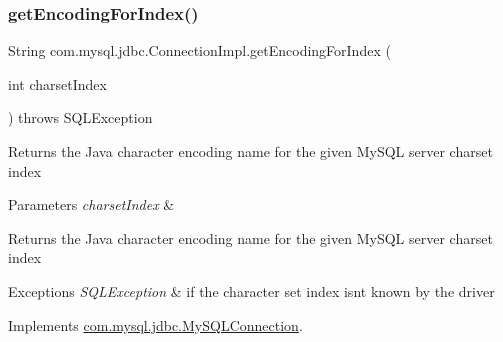 \subsubsection{\texorpdfstring{get\+Encoding\+For\+Index()}{getEncodingForIndex()}}
{\footnotesize\ttfamily String com.\+mysql.\+jdbc.\+Connection\+Impl.\+get\+Encoding\+For\+Index (\begin{DoxyParamCaption}\item[{int}]{charset\+Index }\end{DoxyParamCaption}) throws S\+Q\+L\+Exception}

Returns the Java character encoding name for the given My\+S\+QL server charset index


\begin{DoxyParams}{Parameters}
{\em charset\+Index} & \\
\hline
\end{DoxyParams}
\begin{DoxyReturn}{Returns}
the Java character encoding name for the given My\+S\+QL server charset index 
\end{DoxyReturn}

\begin{DoxyExceptions}{Exceptions}
{\em S\+Q\+L\+Exception} & if the character set index isn\textquotesingle{}t known by the driver \\
\hline
\end{DoxyExceptions}


Implements \mbox{\hyperlink{interfacecom_1_1mysql_1_1jdbc_1_1_my_s_q_l_connection}{com.\+mysql.\+jdbc.\+My\+S\+Q\+L\+Connection}}.

